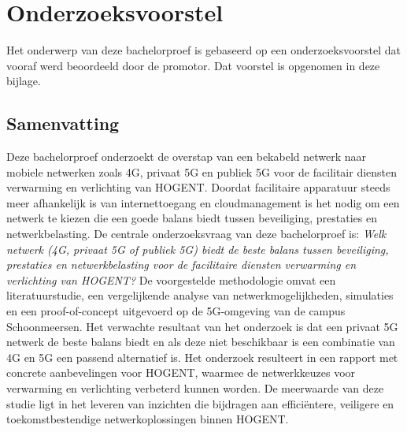 \documentclass[dutch,dit,thesis]{hogentreport}
\begin{document}

%
%

%

%
%




\appendix

\chapter{Onderzoeksvoorstel}

Het onderwerp van deze bachelorproef is gebaseerd op een onderzoeksvoorstel dat vooraf werd beoordeeld door de promotor. Dat voorstel is opgenomen in deze bijlage.

\section*{Samenvatting}

Deze bachelorproef onderzoekt de overstap van een bekabeld netwerk naar mobiele netwerken zoals 4G, privaat 5G en publiek 5G voor de facilitair diensten verwarming en verlichting van HOGENT. Doordat facilitaire apparatuur steeds meer afhankelijk is van internettoegang en cloudmanagement is het nodig om een netwerk te kiezen die een goede balans biedt tussen beveiliging, prestaties en netwerkbelasting. De centrale onderzoeksvraag van deze bachelorproef is: \textit{Welk netwerk (4G, privaat 5G of publiek 5G) biedt de beste balans tussen beveiliging, prestaties en netwerkbelasting voor de facilitaire diensten verwarming en verlichting van HOGENT?} De voorgestelde methodologie omvat een literatuurstudie, een vergelijkende analyse van netwerkmogelijkheden, simulaties en een proof-of-concept uitgevoerd op de 5G-omgeving van de campus Schoonmeersen. Het verwachte resultaat van het onderzoek is dat een privaat 5G netwerk de beste balans biedt en als deze niet beschikbaar is een combinatie van 4G en 5G een passend alternatief is. Het onderzoek resulteert in een rapport met concrete aanbevelingen voor HOGENT, waarmee de netwerkkeuzes voor verwarming en verlichting verbeterd kunnen worden. De meerwaarde van deze studie ligt in het leveren van inzichten die bijdragen aan efficiëntere, veiligere en toekomstbestendige netwerkoplossingen binnen HOGENT.
\end{document}
